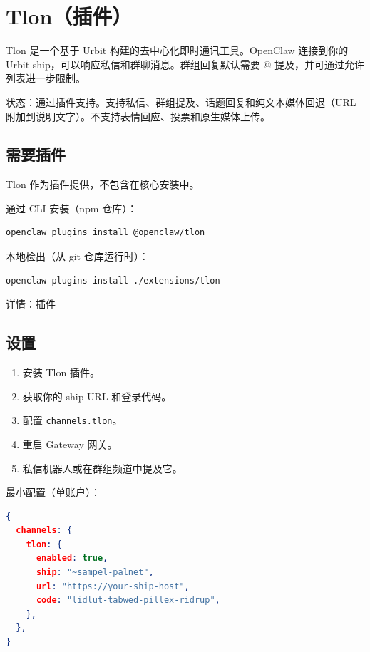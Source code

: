 \clearpage

\section{Tlon（插件）}


Tlon 是一个基于 Urbit 构建的去中心化即时通讯工具。OpenClaw 连接到你的 Urbit ship，可以响应私信和群聊消息。群组回复默认需要 @ 提及，并可通过允许列表进一步限制。

状态：通过插件支持。支持私信、群组提及、话题回复和纯文本媒体回退（URL 附加到说明文字）。不支持表情回应、投票和原生媒体上传。

\subsection{需要插件}


Tlon 作为插件提供，不包含在核心安装中。

通过 CLI 安装（npm 仓库）：

\begin{lstlisting}[language=bash]
openclaw plugins install @openclaw/tlon
\end{lstlisting}


本地检出（从 git 仓库运行时）：

\begin{lstlisting}[language=bash]
openclaw plugins install ./extensions/tlon
\end{lstlisting}


详情：\href{/tools/plugin}{插件}

\subsection{设置}


\begin{enumerate}
  \item 安装 Tlon 插件。
  \item 获取你的 ship URL 和登录代码。
  \item 配置 \texttt{channels.tlon}。
  \item 重启 Gateway 网关。
  \item 私信机器人或在群组频道中提及它。
\end{enumerate}


最小配置（单账户）：

\begin{lstlisting}[language=json]
{
  channels: {
    tlon: {
      enabled: true,
      ship: "~sampel-palnet",
      url: "https://your-ship-host",
      code: "lidlut-tabwed-pillex-ridrup",
    },
  },
}
\end{lstlisting}



